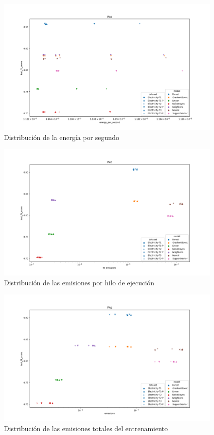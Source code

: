 \begin{figure}[H]
  \centerline{
     \includegraphics[width=\textwidth, keepaspectratio]{img/graph/2-scat-energy-p-s.png}
  }
  \caption{Distribución de la energía por segundo}
  \label{fig:4-2-energy-per-second}
\end{figure}
\begin{figure}[H]
  \centerline{
     \includegraphics[width=\textwidth, keepaspectratio]{img/graph/2-scat-fit-emissions.png}
  }
  \caption{Distribución de las emisiones por hilo de ejecución}
  \label{fig:4-2-energy-per-second}
\end{figure}
\begin{figure}[H]
  \centerline{
     \includegraphics[width=\textwidth, keepaspectratio]{img/graph/2-scat-emissions.png}
  }
  \caption{Distribución de las emisiones totales del entrenamiento}
  \label{fig:4-2-energy-per-second}
\end{figure}

